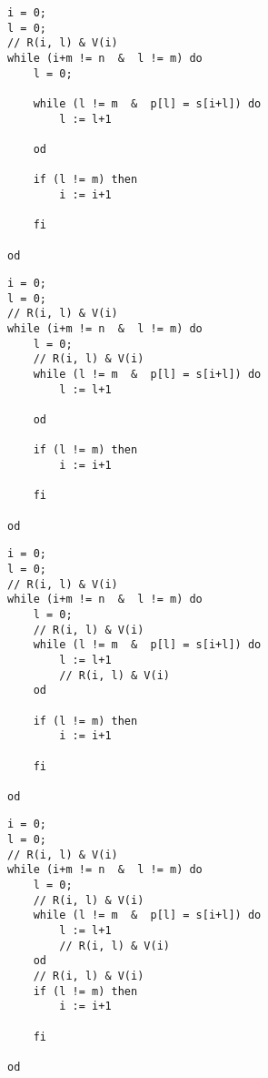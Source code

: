 \documentclass[landscape]{slides}
\begin{document}
\begin{slide}
\begin{verbatim}
i = 0;
l = 0;
// R(i, l) & V(i)
while (i+m != n  &  l != m) do
    l = 0;

    while (l != m  &  p[l] = s[i+l]) do
        l := l+1
        
    od

    if (l != m) then
        i := i+1
        
    fi

od

\end{verbatim}
\end{slide}

\begin{slide}
\begin{verbatim}
i = 0;
l = 0;
// R(i, l) & V(i)
while (i+m != n  &  l != m) do
    l = 0;
    // R(i, l) & V(i)
    while (l != m  &  p[l] = s[i+l]) do
        l := l+1
        
    od

    if (l != m) then
        i := i+1
        
    fi

od

\end{verbatim}
\end{slide}

\begin{slide}
\begin{verbatim}
i = 0;
l = 0;
// R(i, l) & V(i)
while (i+m != n  &  l != m) do
    l = 0;
    // R(i, l) & V(i)
    while (l != m  &  p[l] = s[i+l]) do
        l := l+1
        // R(i, l) & V(i)
    od

    if (l != m) then
        i := i+1
        
    fi

od

\end{verbatim}
\end{slide}

\begin{slide}
\begin{verbatim}
i = 0;
l = 0;
// R(i, l) & V(i)
while (i+m != n  &  l != m) do
    l = 0;
    // R(i, l) & V(i)
    while (l != m  &  p[l] = s[i+l]) do
        l := l+1
        // R(i, l) & V(i)
    od
    // R(i, l) & V(i)
    if (l != m) then
        i := i+1
        
    fi

od

\end{verbatim}
\end{slide}
\end{document}

